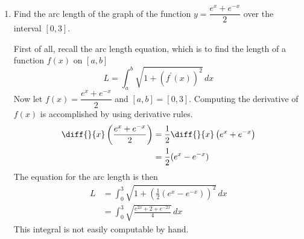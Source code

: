 \documentclass{article}
\begin{document}
\begin{enumerate}[label=\textbf{(6.\arabic*)}]
\item Find the arc length of the graph of the function $y=\dfrac{e^x+e^{-x}}{2}$ over the interval $[0,3]$.

First of all, recall the arc length equation, which is to find the length of a function $f(x)$ on $[a,b]$
\[L=\int_a^b\!\sqrt{1+\left(f^\prime(x)\right)^2}\,dx\]
Now let $f(x)=\dfrac{e^x+e^{-x}}{2}$ and $[a,b]=[0,3]$. Computing the derivative of $f(x)$ is accomplished by using derivative rules.
\begin{align*}
\diff{}{x}\left(\frac{e^x+e^{-x}}{2}\right) &= \frac{1}{2}\diff{}{x}\left(e^x+e^{-x}\right)\\
&= \frac{1}{2}(e^x-e^{-x})
\end{align*}
The equation for the arc length is then
\begin{align*}
L &= \int_0^3\!\sqrt{1+\left(\frac{1}{2}(e^x-e^{-x})\right)^2}\,dx \\
&= \int_0^3\!\sqrt{\frac{e^{2x}+2+e^{-2x}}{4}}\,dx
\end{align*}
This integral is not easily computable by hand. 


\end{enumerate}
\end{document}
